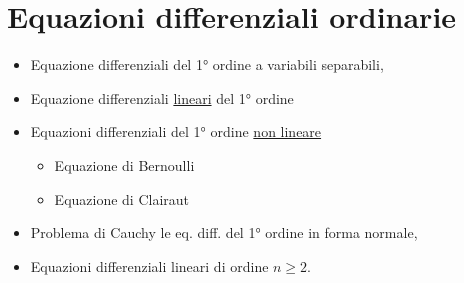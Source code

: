 \section{Equazioni differenziali ordinarie}
\begin{itemize}
	\item Equazione differenziali del 1° ordine a variabili separabili,
	\item Equazione differenziali \underline{lineari} del 1° ordine
	\item Equazioni differenziali del 1° ordine \underline{non lineare}
	\begin{itemize}
		\item Equazione di Bernoulli
		\item Equazione di Clairaut
	\end{itemize}
	\item Problema di Cauchy le eq. diff. del 1° ordine in forma normale,
	\item Equazioni differenziali lineari di ordine $n\geq 2$.
\end{itemize}
